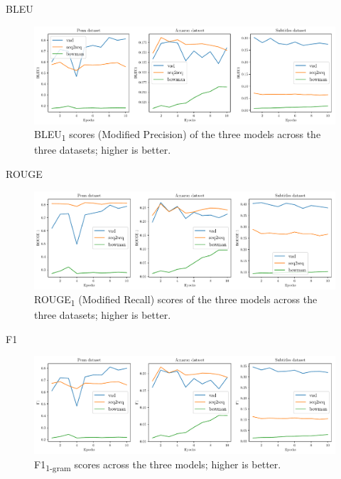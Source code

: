 \documentclass[aspectratio=169, 11pt]{beamer}
\begin{document}
\begin{frame}{BLEU}
  \begin{figure}[!ht]
    \centering
    \includegraphics[width=130mm]{results/bleu1.pdf}
    \caption{BLEU\textsubscript{1} scores (Modified Precision) of the three models across the three datasets; higher is better.\label{r:bleu}}
    \end{figure}  
\end{frame}

\begin{frame}{ROUGE}
  \begin{figure}[!ht]
    \centering
    \includegraphics[width=130mm]{results/rouge_1.pdf}
    \caption{ROUGE\textsubscript{1} (Modified Recall) scores of the three models across the three datasets; higher is better.\label{r:rouge}}
    \end{figure}  
\end{frame}

\begin{frame}{F1}
  \begin{figure}[!ht]
    \centering
    \includegraphics[width=130mm]{results/f1.pdf}
    \caption{F1\textsubscript{1-gram} scores across the three models; higher is better.\label{r:f1}}
    \end{figure}
\end{frame}
\end{document}

